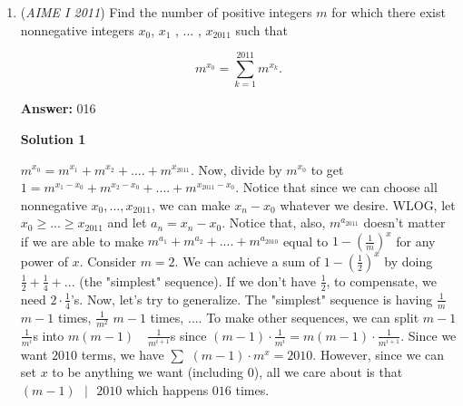 \begin{enumerate}
 $\frac{b}{2a}=-\frac{1}{4} \implies b=-\frac{1}{2}a$.

 
$- \frac{b^2}{4a} + c= - \frac{9}{8}$
$c=\frac{b^2}{4a}- \frac{9}{8} =\frac{b}{2} \cdot \frac{b}{2a} - \frac{9}{8} = -\frac{b}{8}-\frac{9}{8} = \frac{a}{16}-\frac{9}{8}$.

 


 $a+b+c=a-\frac{1}{2}a+\frac{a}{16}-\frac{9}{8} = \frac{16a-8a+a}{16}-\frac{9}{8} = \frac{9a-18}{16} \in \mathbb{Z}$.

 $16 \mid 9(a-2) \implies a-2=b \cdot \frac{16}{9}, b \in \mathbb{Z}$.

 $a=\frac{16b+18}{9} \implies a = \ldots, -\frac{14}{9}, \frac{2}{9}, \frac{18}{9}, \frac{34}{9}, \ldots$.

 $a>0 \implies a_{min} = \frac{2}{9} \implies 2+9 = \boxed{11}$.

 


	\item (\textit{AIME I 2011}) Find the number of positive integers $m$ for which there exist nonnegative integers $x_0$, $x_1$ , $\dots$ , $x_{2011}$ such that

 \[m^{x_0} = \sum_{k = 1}^{2011} m^{x_k}.\]

 \textbf{Answer: }016



\textbf{Solution 1}

$m^{x_0}= m^{x_1} +m^{x_2} + .... + m^{x_{2011}}$. Now, divide by $m^{x_0}$ to get $1= m^{x_1-x_0} +m^{x_2-x_0} + .... + m^{x_{2011}-x_0}$. Notice that since we can choose all nonnegative $x_0,...,x_{2011}$, we can make $x_n-x_0$ whatever we desire. WLOG, let $x_0\geq...\geq x_{2011}$ and let $a_n=x_n-x_0$.  Notice that, also, $m^{a_{2011}}$ doesn't matter if we are able to make $m^{a_1} +m^{a_2} + .... + m^{a_{2010}}$ equal to $1-\left(\frac{1}{m}\right)^x$ for any power of $x$. Consider $m=2$. We can achieve a sum of $1-\left(\frac{1}{2}\right)^x$ by doing $\frac{1}{2}+\frac{1}{4}+...$ (the "simplest" sequence). If we don't have $\frac{1}{2}$, to compensate, we need $2\cdot \frac{1}{4}$'s. Now, let's try to generalize. The "simplest" sequence is having $\frac{1}{m}$ $m-1$ times, $\frac{1}{m^2}$ $m-1$ times, $\ldots$. To make other sequences, we can split $m-1$ $\frac{1}{m^i}$s into $m(m-1)$ $\text{ }\frac{1}{m^{i+1}}$s since $(m-1)\cdot\frac{1}{m^{i}} = m(m-1)\cdot\frac{1}{m^{i+1}}$. Since we want $2010$ terms, we have $\sum$ $(m-1)\cdot m^x=2010$. However, since we can set $x$ to be anything we want (including 0), all we care about is that $(m-1)\text{ }|\text{ } 2010$ which happens $\boxed{016}$ times.


\end{enumerate}
